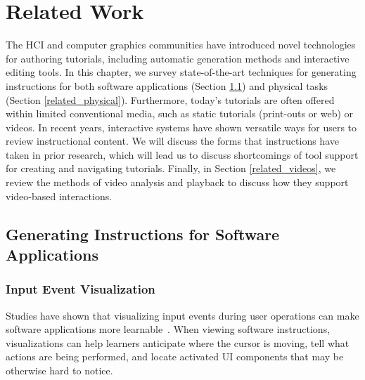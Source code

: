 
\chapter{Related Work}
\label{chapter_related_work}

The HCI and computer graphics communities have introduced novel technologies for authoring tutorials, including automatic generation methods and interactive editing tools.
%
In this chapter, we survey state-of-the-art techniques for generating instructions for both software applications (Section \ref{related_software}) and physical tasks (Section \ref{related_physical}).
%
Furthermore, today's tutorials are often offered within limited conventional media, such as static tutorials (print-outs or web) or videos. In recent years, interactive systems have shown versatile ways for users to review instructional content.
We will discuss the forms that instructions have taken in prior research, which will lead us to discuss shortcomings of tool support for creating and navigating tutorials.
%
Finally, in Section \ref{related_videos}, we review the methods of video analysis and playback to discuss how they support video-based interactions.


\section{Generating Instructions for Software Applications}
\label{related_software}

\subsection{Input Event Visualization}

Studies have shown that visualizing input events during user operations can make software applications more learnable~\cite{Dixon:2010fb}. When viewing software instructions, visualizations can help learners anticipate where the cursor is moving, tell what actions are being performed, and locate activated UI components that may be otherwise hard to notice.

